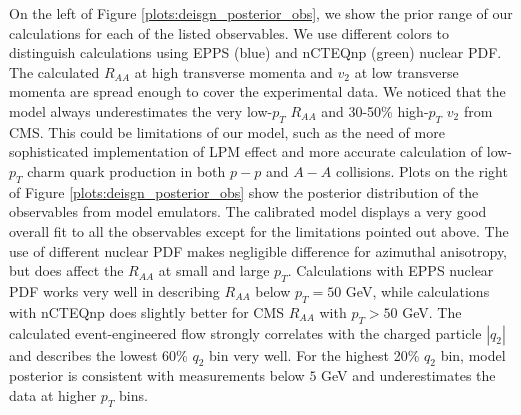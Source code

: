 \documentclass[aps, prc, reprint, amsmath, groupedaddress, nofootinbib]{revtex4-1}
\begin{document}
On the left of Figure \ref{plots:deisgn_posterior_obs}, we show the prior range of our calculations for each of the listed observables. 
We use different colors to distinguish calculations using EPPS (blue) and
nCTEQnp (green) nuclear PDF.
The calculated $R_{AA}$ at high transverse momenta and $v_2$ at low transverse momenta are spread enough to cover the experimental data.
We noticed that the model always underestimates the very low-$p_T$ $R_{AA}$ and 30-50\% high-$p_T$ $v_2$ from CMS.
This could be limitations of our model, such as the need of more sophisticated implementation of LPM effect and more accurate calculation of low-$p_T$ charm quark production in both $p-p$ and $A-A$ collisions. 
Plots on the right of Figure \ref{plots:deisgn_posterior_obs} show the posterior distribution of the observables from model emulators.
The calibrated model displays a very good overall fit to all the observables except for the limitations pointed out above.
The use of different nuclear PDF makes negligible difference for azimuthal anisotropy, but does affect the $R_{AA}$ at small and large $p_T$.
Calculations with EPPS nuclear PDF works very well in describing $R_{AA}$ below $p_T = 50$ GeV, while calculations with nCTEQnp does slightly better for CMS $R_{AA}$ with $p_T>50$ GeV.
The calculated event-engineered flow strongly correlates with the charged particle $|q_2|$ and describes the lowest 60\% $q_2$ bin very well.
For the highest 20\% $q_2$ bin, model posterior is consistent with measurements below $5$ GeV and underestimates the data at higher $p_T$ bins.
\end{document}
